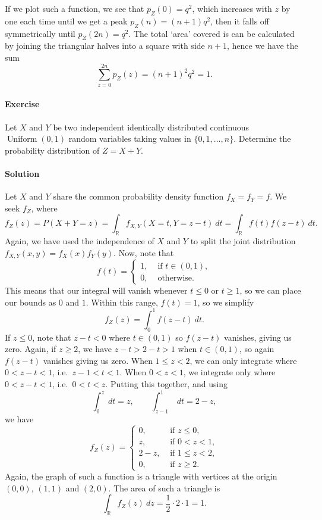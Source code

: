 \documentclass[10pt]{article}
\newcounter{prob}
\def\problem{\stepcounter{prob}\paragraph{Exercise \arabic{prob}}}
\def\solution{\paragraph{Solution}}
\begin{document}
        If we plot such a function, we see that $p_Z(0) = q^2$, which increases with
        $z$ by one each time until we get a peak $p_Z(n) = (n + 1)q^2$, then it
        falls off symmetrically until $p_Z(2n) = q^2$. The total `area' covered is
        can be calculated by joining the triangular halves into a square with side
        $n + 1$, hence we have the sum \[
            \sum_{z = 0}^{2n} p_Z(z) = (n + 1)^2q^2 = 1.
        \] 

        \problem Let $X$ and $Y$ be two independent identically distributed
        continuous $\operatorname{Uniform}(0, 1)$ random variables taking values in
        $\{0, 1, \dots, n\}$. Determine the probability distribution of $Z = X + Y$.

        \solution Let $X$ and $Y$ share the common probability density function $f_X
        = f_Y = f$. We seek $f_Z$, where \[
            f_Z(z) = P(X + Y = z) = \int_{\mathbb{R}} f_{X, Y}(X = t, Y = z - t)\:dt
            = \int_{\mathbb{R}} f(t)f(z - t)\:dt.
        \] Again, we have used the independence of $X$ and $Y$ to split the joint
        distribution $f_{X, Y}(x, y) = f_X(x) f_Y(y)$. Now, note that \[
            f(t) = \begin{cases}
                1, &\text{ if }t \in (0, 1), \\
                0, &\text{ otherwise}.
            \end{cases}
        \] This means that our integral will vanish whenever $t \leq 0$ or $t \geq
        1$, so we can place our bounds as $0$ and $1$. Within this range, $f(t) = 1$,
        so we simplify \[
            f_Z(z) = \int_0^1 f(z - t)\:dt.
        \] If $z \leq 0$, note that $z - t < 0$ where $t \in (0, 1)$ so $f(z -
        t)$ vanishes, giving us zero. Again, if $z \geq 2$, we have $z - t > 2 - t >
        1$ when $t \in (0, 1)$, so again $f(z - t)$ vanishes giving us zero. When $1
        \leq z < 2$, we can only integrate where $0 < z - t < 1$, i.e.\ $z - 1 < t <
        1$. When $0 < z < 1$, we integrate only where $0 < z - t < 1$, i.e.\ $0 < t
        < z$. Putting this together, and using \[
            \int_0^z \:dt = z, \qquad \int_{z - 1}^1\:dt = 2 - z,
        \] we have \[
            f_Z(z) = \begin{cases}
                0, &\text{ if }z \leq 0, \\
                z, &\text{ if } 0 < z < 1, \\
                2 - z, &\text{ if } 1 \leq z < 2, \\
                0, &\text{ if } z \geq 2.
            \end{cases}
        \] Again, the graph of such a function is a triangle with vertices at the
        origin $(0, 0)$, $(1, 1)$ and $(2, 0)$. The area of such a triangle is \[
            \int_{\mathbb{R}}f_Z(z)\:dz = \frac{1}{2}\cdot 2 \cdot 1 = 1.
        \] 
\end{document}
